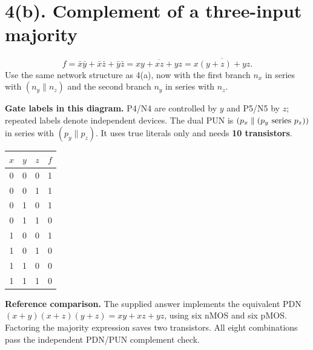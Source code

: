 \documentclass[11pt,a4paper]{article}
\newcommand{\VDD}{V_{\mathrm{DD}}}
\newcommand{\VSS}{V_{\mathrm{SS}}}
\newcommand{\MOS}[5]{
  \coordinate (#1) at (#2,#3);
  \coordinate (#1t) at ($(#1)+(0,.55)$);
  \coordinate (#1b) at ($(#1)+(0,-.55)$);
  \draw (#1t)--($(#1)+(0,.30)$)--($(#1)+(-.18,.30)$);
  \draw ($(#1)+(-.18,.34)$)--($(#1)+(-.18,-.34)$);
  \draw ($(#1)+(-.18,-.30)$)--($(#1)+(0,-.30)$)--(#1b);
  \draw ($(#1)+(-.35,.33)$)--($(#1)+(-.35,-.33)$);
  \def\type{#5}\def\ptype{p}
  \ifx\type\ptype
    \draw ($(#1)+(-.78,0)$)--($(#1)+(-.53,0)$);
    \draw ($(#1)+(-.465,0)$) circle (.065);
    \draw ($(#1)+(-.40,0)$)--($(#1)+(-.35,0)$);
  \else
    \draw ($(#1)+(-.78,0)$)--($(#1)+(-.35,0)$);
  \fi
  \node[anchor=east] at ($(#1)+(-.82,0)$) {$#4$};
  \node[anchor=west,font=\scriptsize] at ($(#1)+(.10,0)$) {#1};
}
\begin{document}
\section*{4(b). Complement of a three-input majority}
\[
 f=\bar x\bar y+\bar x\bar z+\bar y\bar z
   =\overline{xy+xz+yz}
   =\boxed{\overline{x(y+z)+yz}}.
\]
Use the same network structure as 4(a), now with the first branch $n_x$ in series with $(n_y\parallel n_z)$ and the second branch $n_y$ in series with $n_z$.
\begin{center}
\end{center}
\textbf{Gate labels in this diagram.} P4/N4 are controlled by $y$ and P5/N5 by $z$; repeated labels denote independent devices.
The dual PUN is $(p_x\parallel(p_y\hbox{ series }p_z))$ in series with $(p_y\parallel p_z)$. It uses true literals only and needs \textbf{10 transistors}.
\begin{center}\begin{tabular}{ccc|c}\toprule
$x$&$y$&$z$&$f$\\\midrule
0&0&0&1\\0&0&1&1\\0&1&0&1\\0&1&1&0\\
1&0&0&1\\1&0&1&0\\1&1&0&0\\1&1&1&0\\\bottomrule
\end{tabular}\end{center}
\textbf{Reference comparison.} The supplied answer implements the equivalent PDN $(x+y)(x+z)(y+z)=xy+xz+yz$, using six nMOS and six pMOS. Factoring the majority expression saves two transistors. All eight combinations pass the independent PDN/PUN complement check.
\end{document}
